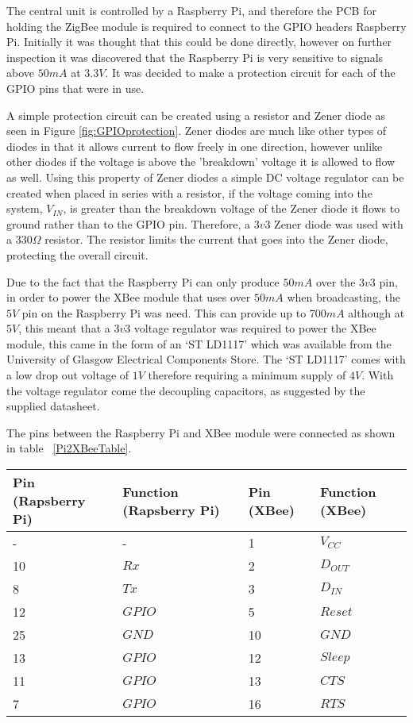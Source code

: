 

The central unit is controlled by a Raspberry Pi, and therefore the PCB for holding the ZigBee module is required to connect to the GPIO headers Raspberry Pi.  Initially it was thought that this could be done directly, however on further inspection it was discovered that the Raspberry Pi is very sensitive to signals above $50\unit{mA}$ at $3.3\unit{V}$. It was decided to make a protection circuit for each of the GPIO pins that were in use. 

A simple protection circuit can be created using a resistor and Zener diode as seen in Figure \ref{fig:GPIOprotection}. Zener diodes are much like other types of diodes in that it allows current to flow freely in one direction, however unlike other diodes if the voltage is above the 'breakdown' voltage it is allowed to flow as well. Using this property of Zener diodes a simple DC voltage regulator can be created when placed in series with a resistor, if the voltage coming into the system, $V_{IN}$, is greater than the breakdown voltage of the Zener diode it flows to ground rather than to the GPIO pin. Therefore, a $3v3$ Zener diode was used with a $330\Omega$ resistor. The resistor limits the current that goes into the Zener diode, protecting the overall circuit.

Due to the fact that the Raspberry Pi can only produce $50\unit{mA}$ over the $3v3$ pin, in order to power the XBee module that uses over $50\unit{mA}$ when broadcasting, the $5\unit{V}$ pin on the Raspberry Pi was need. This can provide up to $700\unit{mA}$ although at $5\unit{V}$, this meant that a $3v3$ voltage regulator was required to power the XBee module, this came in the form of an `ST LD1117' which was available from the University of Glasgow Electrical Components Store. The `ST LD1117' comes with a low drop out voltage of $1\unit{V}$ therefore requiring a minimum supply of $4\unit{V}$. With the voltage regulator come the decoupling capacitors, as suggested by the supplied datasheet.

The pins between the Raspberry Pi and XBee module were connected as shown in table ~\ref{Pi2XBeeTable}.


\begin{center}
  \begin{tabular}{| l | l | l | l |}
    \hline
    \bf{Pin (Rapsberry Pi)} & \bf{Function (Rapsberry Pi)} & \bf{Pin (XBee)} & \bf{Function (XBee)} \\ \hline
     - & - & 1 & \(V_{CC}\) \\ \hline
	10 & \(Rx\) & 2 & \(D_{OUT}\) \\ \hline
	8 & \(Tx\) & 3 & \(D_{IN}\) \\ \hline
	12 & \(GPIO\) & 5 & \(Reset\) \\ \hline
	25 & \(GND\) & 10 & \(GND\) \\ \hline
	13 & \(GPIO\) & 12 & \(Sleep\) \\ \hline
	11 & \(GPIO\) & 13 & \(CTS\) \\ \hline
	7 & \(GPIO\) & 16 & \(RTS\) \\
    \hline
  \end{tabular}
\label{Pi2XBeeTable}
\end{center}


